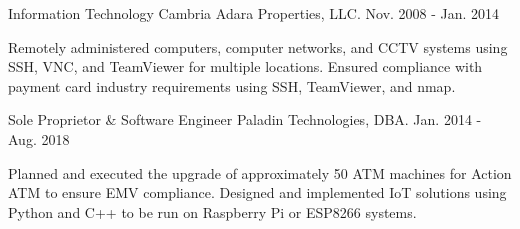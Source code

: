 

\begin{cventries}

  \cventry
    {Information Technology} %
    {Cambria Adara Properties, LLC.} %
    {Nov. 2008 - Jan. 2014} %
    {} %
    {
      \begin{cvitems} %
				Remotely administered computers, computer networks, and CCTV
				systems using SSH, VNC, and TeamViewer for multiple locations.
				Ensured compliance with payment card industry requirements
				using SSH, TeamViewer, and nmap.
      \end{cvitems}
    }

  \cventry
    {Sole Proprietor \& Software Engineer} %
    {Paladin Technologies, DBA.} %
    {Jan. 2014 - Aug. 2018} %
    {} %
    {
      \begin{cvitems} %
				Planned and executed the upgrade of approximately 50 ATM
				machines for Action ATM to ensure EMV compliance. Designed
				and implemented IoT solutions using Python and C++ to be run
				on Raspberry Pi or ESP8266 systems.
      \end{cvitems}
    }
\end{cventries}
